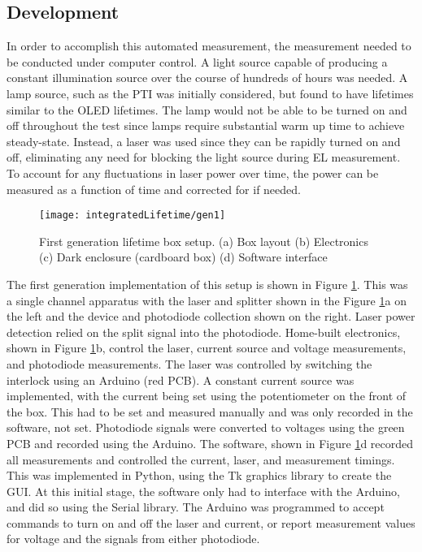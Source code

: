 \documentclass[../thesis.tex]{subfiles}
\begin{document}
\subsection{Development}

In order to accomplish this automated measurement, the \pl measurement needed to be conducted under computer control.
A light source capable of producing a constant illumination source over the course of hundreds of hours was needed.
A lamp source, such as the PTI was initially considered, but found to have lifetimes similar to the OLED lifetimes.
The lamp would not be able to be turned on and off throughout the test since lamps require substantial warm up time to achieve steady-state.
Instead, a laser was used since they can be rapidly turned on and off, eliminating any need for blocking the light source during EL measurement.
To account for any fluctuations in laser power over time, the power can be measured as a function of time and corrected for if needed.

\begin{figure}[ht]
\centering
\texttt{[image: integratedLifetime/gen1]}
\caption{First generation lifetime box setup.  (a)  Box layout  (b) Electronics (c) Dark enclosure (cardboard box) (d) Software interface}
\label{fig:gen1}
\end{figure}

The first generation implementation of this setup is shown in Figure \ref{fig:gen1}.
This was a single channel apparatus with the laser and splitter shown in the Figure \ref{fig:gen1}a on the left and the device and photodiode collection shown on the right.
Laser power detection relied on the split signal into the photodiode.
Home-built electronics, shown in Figure \ref{fig:gen1}b, control the laser, current source and voltage measurements, and photodiode measurements.
The laser was controlled by switching the interlock using an Arduino (red PCB).
A constant current source was implemented, with the current being set using the potentiometer on the front of the box.  
This had to be set and measured manually and was only recorded in the software, not set.
Photodiode signals were converted to voltages using the green PCB and recorded using the Arduino. 
The software, shown in Figure \ref{fig:gen1}d recorded all measurements and controlled the current, laser, and measurement timings.
This was implemented in Python, using the Tk graphics library to create the GUI.  
At this initial stage, the software only had to interface with the Arduino, and did so using the Serial library.
The Arduino was programmed to accept commands to turn on and off the laser and current, or report measurement values for voltage and the signals from either photodiode.
\end{document}
